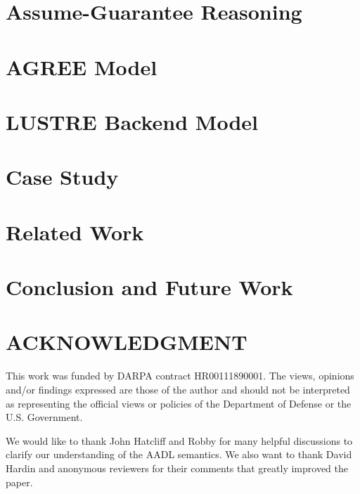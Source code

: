 \documentclass[runningheads]{llncs}
\begin{document}
\section{Assume-Guarantee Reasoning}


\section{AGREE Model}
\label{agree}


\section{LUSTRE Backend Model}
\label{lustre}


\section{Case Study}
\label{case-study}


\section{Related Work}
\label{rw}


\section{Conclusion and Future Work}
\label{conclusion}


\section*{ACKNOWLEDGMENT}
This work was funded by DARPA contract HR00111890001. The
views, opinions and/or findings expressed are those of the author
and should not be interpreted as representing the official views or
policies of the Department of Defense or the U.S. Government.

We would like to thank John Hatcliff and Robby for many helpful discussions to clarify our understanding of the AADL semantics.
We also want to thank David Hardin and anonymous reviewers for their comments that greatly improved the paper.

%
%
%


%
\end{document}
